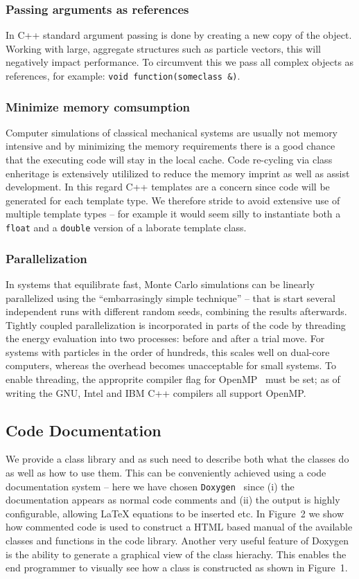 \documentclass[10pt]{bmc_article}
\newenvironment{bmcformat}{\begin{raggedright}\baselineskip20pt\sloppy\setboolean{publ}{false}}{\end{raggedright}\baselineskip20pt\sloppy}
\begin{document}
\begin{bmcformat}
\subsubsection*{Passing arguments as references}
In C++ standard argument passing is done by creating a new copy of the object.
Working with large, aggregate structures such as particle vectors, this will negatively impact performance. To circumvent this we pass all complex objects as references, for example: \verb"void function(someclass &)".

\subsubsection*{Minimize memory comsumption}
Computer simulations of classical mechanical systems are usually not memory intensive and by minimizing the memory requirements there is a good chance that the executing code will stay in the local cache.
Code re-cycling via class enheritage is extensively utililized to reduce the memory imprint as well as assist development.
In this regard C++ templates are a concern since code will be generated for each template type.
We therefore stride to avoid extensive use of multiple template types -- for example it would seem silly to instantiate both a \verb"float" and a \verb"double" version of a laborate template class.

\subsubsection*{Parallelization}
In systems that equilibrate fast, Monte Carlo simulations can be linearly parallelized using the ``embarrasingly simple technique'' -- that is start several independent runs with different random seeds, combining the results afterwards.
Tightly coupled parallelization is incorporated in parts of the code by threading the energy evaluation into two processes: before and after a trial move.
For systems with particles in the order of hundreds, this scales well on dual-core computers, whereas the overhead becomes unacceptable for small systems.
To enable threading, the approprite compiler flag for OpenMP~\cite{openmp:98} must be set; as of writing the GNU, Intel and IBM C++ compilers all support OpenMP.

\subsection*{Code Documentation}
We provide a class library and as such need to describe both what the classes do as well as how to use them.
This can be conveniently achieved using a code documentation system -- here we have chosen \verb"Doxygen"~\cite{doxygen} since
(i) the documentation appears as normal code comments and
(ii) the output is highly configurable, allowing LaTeX equations to be inserted etc.
In Figure~2 we show how commented code is used to construct a HTML based manual of the available
classes and functions in the code library.
Another very useful feature of Doxygen is the ability to generate a graphical view of the class hierachy.
This enables the end programmer to visually see how a class is constructed as shown in Figure~1.


\end{bmcformat}
\end{document}
